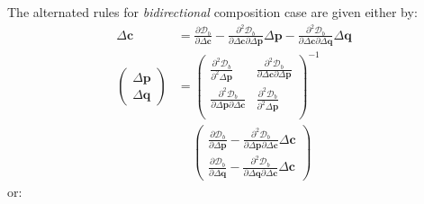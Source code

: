 The alternated rules for \emph{bidirectional} composition case are given either by:
\begin{equation}
    \begin{aligned}
        \Delta \mathbf{c} & =  \frac{\partial \mathcal{D}_b}{\partial \Delta \mathbf{c}} - \frac{\partial^2 \mathcal{D}_b}{\partial \Delta \mathbf{c} \partial \Delta \mathbf{p}} \Delta \mathbf{p} - \frac{\partial^2 \mathcal{D}_b}{\partial \Delta \mathbf{c} \partial \Delta \mathbf{q}} \Delta \mathbf{q}
        \\
        \begin{pmatrix}
            \Delta\mathbf{p}
            \\
            \Delta\mathbf{q}
        \end{pmatrix} & = 
        \begin{pmatrix}
            \frac{\partial^2 \mathcal{D}_b}{\partial^2 \Delta \mathbf{p}} & \frac{\partial^2 \mathcal{D}_b}{\partial \Delta \mathbf{c} \partial \Delta \mathbf{p}} 
            \\ 
            \frac{\partial^2 \mathcal{D}_b}{\partial \Delta \mathbf{p} \partial \Delta \mathbf{c}} & \frac{\partial^2 \mathcal{D}_b}{\partial^2 \Delta \mathbf{p}} 
            \\
        \end{pmatrix}^{-1}
        \\
        & \quad \,
        \begin{pmatrix}
            \frac{\partial \mathcal{D}_b}{\partial \Delta \mathbf{p}} - \frac{\partial^2 \mathcal{D}_b}{\partial \Delta \mathbf{p} \partial \Delta \mathbf{c}} \Delta \mathbf{c}
            \\
            \frac{\partial \mathcal{D}_b}{\partial \Delta \mathbf{q}} - \frac{\partial^2 \mathcal{D}_b}{\partial \Delta \mathbf{q} \partial \Delta \mathbf{c}} \Delta \mathbf{c}
        \end{pmatrix}
        \label{eq:bidirectional_newton_alternated_solution1}
    \end{aligned}
\end{equation}
or:
